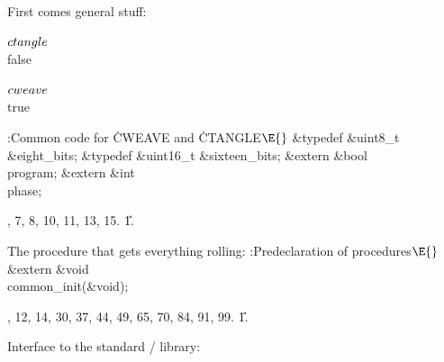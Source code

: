 



First comes general stuff:



\Y\B\4\D$\\{ctangle}$ \5
\\{false}\par
\B\4\D$\\{cweave}$ \5
\\{true}\par
\Y\B\4:Common code for \.{CWEAVE} and \.{CTANGLE}\X${}\E{}$\6
\&{typedef} \&{uint8\_t} \&{eight\_bits};\6
\&{typedef} \&{uint16\_t} \&{sixteen\_bits};\6
\&{extern} \&{bool} \\{program};\6
\&{extern} \&{int} \\{phase};\par
{}, 7, 8, 10, 11, 13, 15.
\U1.\fi

The procedure that gets everything rolling:
\Y\B\4:Predeclaration of procedures\X${}\E{}$\6
\&{extern} \&{void} \\{common\_init}(\&{void});\par
{}, 12, 14, 30, 37, 44, 49, 65, 70, 84, 91, 99.
\U1.\fi

Interface to the standard \CEE/ library:

